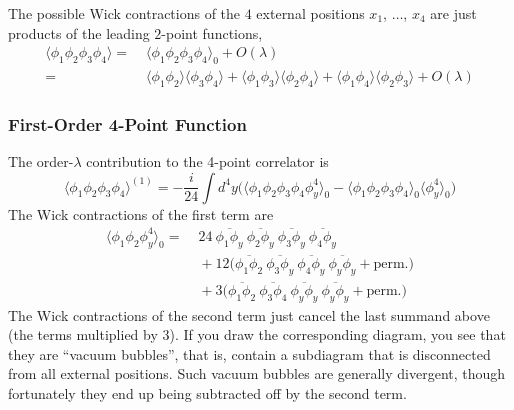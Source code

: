 \documentclass[12pt]{article}
\begin{document}
The possible Wick contractions of the $4$ external positions $x_1$,
$\dots$, $x_4$ are just products of the leading $2$-point functions,
\begin{equation}
  \begin{split}
    \langle \phi_1 \phi_2\phi_3 \phi_4 \rangle 
    =&\;
    \langle \phi_1 \phi_2\phi_3 \phi_4 \rangle_0 + O(\lambda) 
    \\ =&\;
    \langle \phi_1 \phi_2 \rangle
    \langle \phi_3 \phi_4 \rangle +
    \langle \phi_1 \phi_3 \rangle
    \langle \phi_2 \phi_4 \rangle +
    \langle \phi_1 \phi_4 \rangle
    \langle \phi_2 \phi_3 \rangle +
    O(\lambda)
  \end{split}
\end{equation}


\subsubsection{First-Order 4-Point Function}

The order-$\lambda$ contribution to the 4-point correlator is
\begin{equation}
  \langle \phi_1 \phi_2 \phi_3 \phi_4 \rangle^{(1)} = 
  - \frac{i}{24} \int d^4y \Big(
  \langle \phi_1 \phi_2 \phi_3\phi_4 \phi_y^4 \rangle_0 - 
  \langle \phi_1 \phi_2 \phi_3 \phi_4  \rangle_0 
  \langle \phi_y^4 \rangle_0 
  \Big)
\end{equation}
The Wick contractions of the first term are
\begin{equation}
  \begin{split}
    \langle \phi_1 \phi_2 \phi_y^4 \rangle_0 =&\;
    24~
    \overline{\phi_1 \phi_y}~
    \overline{\phi_2 \phi_y}~
    \overline{\phi_3 \phi_y}~
    \overline{\phi_4 \phi_y}
    \\ &\;
    + 12\Big(
    \overline{\phi_1 \phi_2}~
    \overline{\phi_3 \phi_y}~
    \overline{\phi_4 \phi_y}~
    \overline{\phi_y \phi_y}
    + \text{perm.}
    \Big)
    \\ &\;
    + 3\Big(
    \overline{\phi_1 \phi_2}~
    \overline{\phi_3 \phi_4}~
    \overline{\phi_y \phi_y}~
    \overline{\phi_y \phi_y}
    + \text{perm.}
    \Big)
  \end{split}
\end{equation}
The Wick contractions of the second term just cancel the last summand
above (the terms multiplied by $3$). If you draw the corresponding
diagram, you see that they are ``vacuum bubbles'', that is, contain a
subdiagram that is disconnected from all external positions. Such
vacuum bubbles are generally divergent, though fortunately they end up
being subtracted off by the second term.
\end{document}
